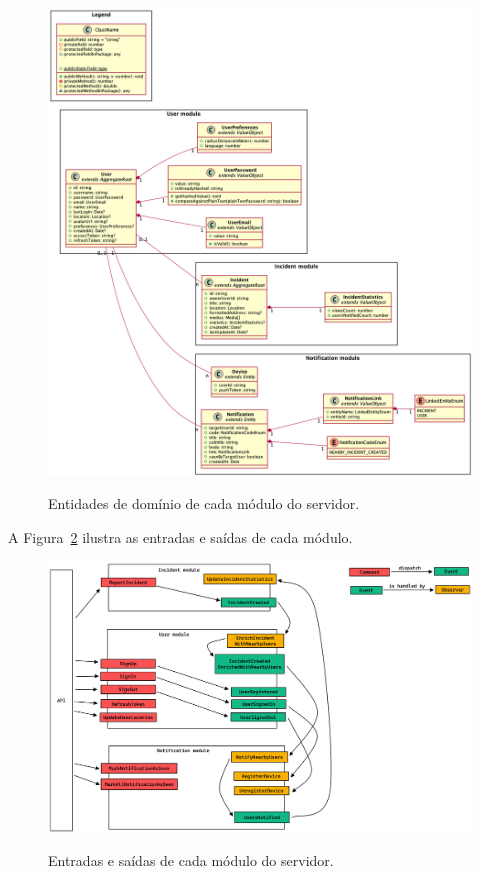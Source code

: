 \begin{figure}[htbp]
	\caption{\small Entidades de domínio de cada módulo do servidor.}
	\centering
	\includegraphics[width=\textwidth]{../diagrams/out/system_server_all-modules_domain-entities.png}
	\label{f.system_server_all-modules_domain-entities}
\end{figure}

\FloatBarrier

A Figura~\ref{f.system_server_all_modules_commands-observers-events} ilustra as entradas e saídas de cada módulo.

\begin{figure}[htbp]
	\caption{\small Entradas e saídas de cada módulo do servidor.}
	\centering
	\includegraphics[width=\textwidth]{../diagrams/out/system_server_all_modules_commands-observers-events.png}
	\label{f.system_server_all_modules_commands-observers-events}
\end{figure}

